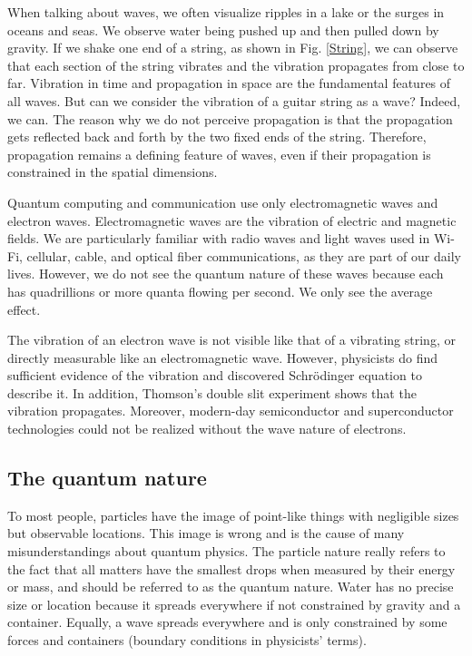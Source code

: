 \documentclass[oneside, letter, 12pt]{book}
\begin{document}
When talking about waves, we often visualize ripples in a lake or the surges in oceans and seas. We observe water being pushed up and then pulled down by gravity. If we shake one end of a string, as shown in Fig. \ref{String}, we can observe that each section of the string vibrates and the vibration propagates from close to far. Vibration in time and propagation in space are the fundamental features of all waves. But can we consider the vibration of a guitar string as a wave? Indeed, we can. The reason why we do not perceive propagation is that the propagation gets reflected back and forth by the two fixed ends of the string. Therefore, propagation remains a defining feature of waves, even if their propagation is constrained in the spatial dimensions.

Quantum computing and communication use only electromagnetic waves and electron waves. Electromagnetic waves are the vibration of electric and magnetic fields. We are particularly familiar with radio waves and light waves used in Wi-Fi, cellular, cable, and optical fiber communications, as they are part of our daily lives. However, we do not see the quantum nature of these waves because each has quadrillions or more quanta flowing per second. We only see the average effect.

The vibration of an electron wave is not visible like that of a vibrating string, or directly measurable like an electromagnetic wave. However, physicists do find sufficient evidence of the vibration and discovered Schrödinger equation to describe it. In addition, Thomson's double slit experiment\cite{THOMSON} shows that the vibration propagates. Moreover, modern-day semiconductor and superconductor technologies could not be realized without the wave nature of electrons.

\subsection{The quantum nature}
To most people, particles have the image of point-like things with negligible sizes but observable locations. This image is wrong and is the cause of many misunderstandings about quantum physics. The particle nature really refers to the fact that all matters have the smallest drops when measured by their energy or mass, and should be referred to as the quantum nature. Water has no precise size or location because it spreads everywhere if not constrained by gravity and a container. Equally, a wave spreads everywhere and is only constrained by some forces and containers (boundary conditions in physicists' terms).
\end{document}
